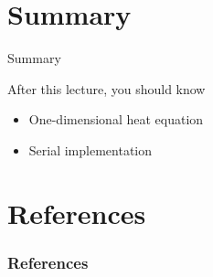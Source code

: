 \documentclass[\classoption]{beamer}
\begin{document}
\section{Summary}
\begin{frame}{Summary}
\begin{block}{After this lecture, you should know}
\begin{itemize}
\item One-dimensional heat equation
\item Serial implementation
\end{itemize}
\end{block}
\end{frame}


\section{References}

\begin{frame}[t, allowframebreaks]
\frametitle{References}


\end{frame}
\end{document}
